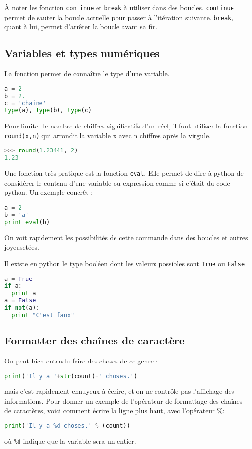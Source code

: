\documentclass[a4paper,twoside]{article}
\begin{document}
\begin{remarque}
À noter les fonction \texttt{continue} et \texttt{break} à utiliser dans des boucles. \texttt{continue} permet de sauter la boucle actuelle pour passer à l'itération suivante. \texttt{break}, quant à lui, permet d'arrêter la boucle avant sa fin.
\end{remarque}



\subsection{Variables et types numériques}

La fonction  permet de connaître le type d'une variable.
\begin{lstlisting}[language=python]
a = 2
b = 2.
c = 'chaine'
type(a), type(b), type(c)
\end{lstlisting}

Pour limiter le nombre de chiffres significatifs d'un réel, il faut utiliser la fonction \texttt{round(x,n)} qui arrondit la variable x avec n chiffres après la virgule.
\begin{lstlisting}[language=python]
>>> round(1.23441, 2)
1.23
\end{lstlisting}

Une fonction très pratique est la fonction \texttt{eval}. Elle permet de dire à python de considérer le contenu d'une variable ou expression comme si c'était du code python. Un exemple concrêt :
\begin{lstlisting}[language=python]
a = 2
b = 'a'
print eval(b)
\end{lstlisting}

On voit rapidement les possibilités de cette commande dans des boucles et autres joyeusetées.

\bigskip

Il existe en python le type booléen dont les valeurs possibles sont \texttt{True} ou \texttt{False}
\begin{lstlisting}[language=python]
a = True
if a:
  print a
a = False
if not(a):
  print "C'est faux"
\end{lstlisting}

\subsection{Formatter des chaînes de caractère}
On peut bien entendu faire des choses de ce genre : 
\begin{lstlisting}[language=python]
print('Il y a '+str(count)+' choses.')
\end{lstlisting}
mais c'est rapidement ennuyeux à écrire, et on ne contrôle pas l'affichage des informations. Pour donner un exemple de l'opérateur de formattage des chaînes de caractères, voici comment écrire la ligne plus haut, avec l'opérateur \og\%\fg :
\begin{lstlisting}[language=python]
print('Il y a %d choses.' % (count))
\end{lstlisting}
où \texttt{\%d} indique que la variable sera un entier.
\end{document}
